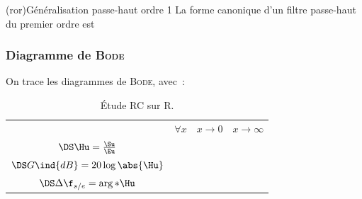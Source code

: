 \documentclass[../../main/main.tex]{subfiles}
\begin{document}
\begin{tcb*}(ror){Généralisation passe-haut ordre 1}
	La forme canonique d'un filtre passe-haut du premier ordre est
	\psw{
		\[
			\boxed{\Hu(x) = H_0\frac{\jx}{1+\jx}}
			\qav
			x = \frac{\w}{\w_c}
			\qet
			H_0 = \cte
		\]
	}
	\vspace{-15pt}
\end{tcb*}

\subsubsection{Diagramme de \textsc{Bode}}
On trace les diagrammes de \textsc{Bode}, avec~:
\begin{table}[htbp!]
	\centering
	\caption{Étude RC sur R.}
	\begin{tabularx}{.7\linewidth}{cYYY}
		\toprule
		 &
		$\forall x$
		 &
		$x\to 0$
		 &
		$x\to\infty$
		\\
		\addlinespace[0.5em]
		\cmidrule(lr){2-4}
		$\DS\Hu = \frac{\Su}{\Eu}$
		 &
		 &
		\psw{$\jx$}
		 &
		\\
		\addlinespace[0.5em]
		$\DS G\ind{dB} = 20 \log \abs{\Hu}$
		 &
		 &
		 &
		\\
		\addlinespace[0.5em]
		$\DS\Delta\f_{s/e} = \arg*{\Hu}$
		 &
		 &
		 &
		\\
		\bottomrule
	\end{tabularx}
	\label{tab:rcr}
\end{table}
\end{document}

